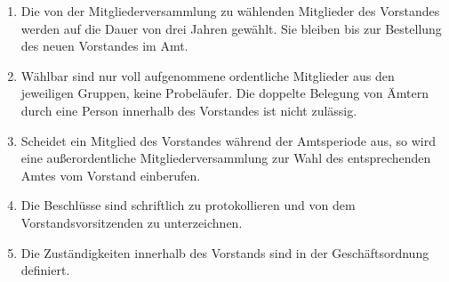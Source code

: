 \begin{enumerate}
\begin{itemize}
        \item Aufstellung eines etwaigen Haushaltsplans und Erstellung eines Jahresberichts.
    \end{itemize}

    \item \label{sa:abs:h2h502} Die von der Mitgliederversammlung zu wählenden Mitglieder des Vorstandes werden auf die Dauer von drei Jahren gewählt. Sie bleiben bis zur Bestellung des neuen Vorstandes im Amt.

    \item \label{sa:abs:wp7zdq} Wählbar sind nur voll aufgenommene ordentliche Mitglieder aus den jeweiligen Gruppen, keine Probeläufer. Die doppelte Belegung von Ämtern durch eine Person innerhalb des Vorstandes ist nicht zulässig. 

    \item \label{sa:abs:fiifa7} Scheidet ein Mitglied des Vorstandes während der Amtsperiode aus, so wird eine außerordentliche Mitgliederversammlung zur Wahl des entsprechenden Amtes vom Vorstand einberufen.

    \item \label{sa:abs:u6d6wh} Die Beschlüsse sind schriftlich zu protokollieren und von dem Vorstandsvorsitzenden zu unterzeichnen.

    \item \label{sa:abs:1ux03y} Die Zuständigkeiten innerhalb des Vorstands sind in der Geschäftsordnung definiert.
\end{enumerate}

